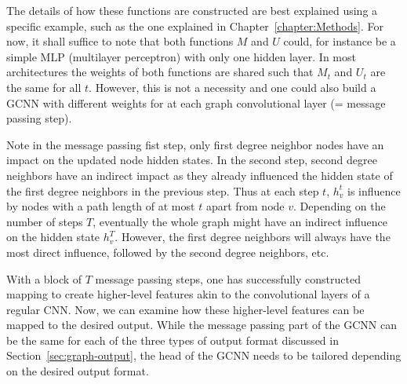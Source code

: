The details of how these functions are constructed are best explained using a specific example, such as the one explained in Chapter~\ref{chapter:Methods}. For now, it shall suffice to note that both functions $M$ and $U$ could, for instance be a simple MLP (multilayer perceptron) with only one hidden layer. In most architectures the weights of both functions are shared such that $M_t$ and $U_t$ are the same for all $t$. However, this is not a necessity and one could also build a GCNN with different weights for at each graph convolutional layer (= message passing step).

Note in the message passing fist step, only first degree neighbor nodes have an impact on the updated node hidden states. In the second step, second degree neighbors have an indirect impact as they already influenced the hidden state of the first degree neighbors in the previous step. Thus at each step $t$, $h_v^t$ is influence by nodes with a path length of at most $t$ apart from node $v$. Depending on the number of steps $T$, eventually the whole graph might have an indirect influence on the hidden state $h_v^T$. However, the first degree neighbors will always have the most direct influence, followed by the second degree neighbors, etc.

With a block of $T$ message passing steps, one has successfully constructed mapping to create higher-level features akin to the convolutional layers of a regular CNN. Now, we can examine how these higher-level features can be mapped to the desired output. While the message passing part of the GCNN can be the same for each of the three types of output format discussed in Section~\ref{sec:graph-output}, the head of the GCNN needs to be tailored depending on the desired output format.


